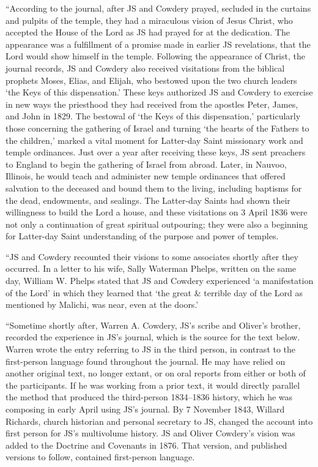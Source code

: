 			``According to the journal, after JS and Cowdery prayed, secluded in the curtains and pulpits of the temple, they had a miraculous vision of Jesus Christ, who accepted the House of the Lord as JS had prayed for at the dedication. The appearance was a fulfillment of a promise made in earlier JS revelations, that the Lord would show himself in the temple. Following the appearance of Christ, the journal records, JS and Cowdery also received visitations from the biblical prophets Moses, Elias, and Elijah, who bestowed upon the two church leaders `the Keys of this dispensation.' These keys authorized JS and Cowdery to exercise in new ways the priesthood they had received from the apostles Peter, James, and John in 1829. The bestowal of `the Keys of this dispensation,' particularly those concerning the gathering of Israel and turning `the hearts of the Fathers to the children,' marked a vital moment for Latter-day Saint missionary work and temple ordinances. Just over a year after receiving these keys, JS sent preachers to England to begin the gathering of Israel from abroad. Later, in Nauvoo, Illinois, he would teach and administer new temple ordinances that offered salvation to the deceased and bound them to the living, including baptisms for the dead, endowments, and sealings. The Latter-day Saints had shown their willingness to build the Lord a house, and these visitations on 3 April 1836 were not only a continuation of great spiritual outpouring; they were also a beginning for Latter-day Saint understanding of the purpose and power of temples.
			
			``JS and Cowdery recounted their visions to some associates shortly after they occurred. In a letter to his wife, Sally Waterman Phelps, written on the same day, William W. Phelps stated that JS and Cowdery experienced `a manifestation of the Lord' in which they learned that `the great \& terrible day of the Lord as mentioned by Malichi, was near, even at the doors.'
			
			``Sometime shortly after, Warren A. Cowdery, JS's scribe and Oliver's brother, recorded the experience in JS's journal, which is the source for the text below. Warren wrote the entry referring to JS in the third person, in contrast to the first-person language found throughout the journal. He may have relied on another original text, no longer extant, or on oral reports from either or both of the participants. If he was working from a prior text, it would directly parallel the method that produced the third-person 1834--1836 history, which he was composing in early April using JS's journal. By 7 November 1843, Willard Richards, church historian and personal secretary to JS, changed the account into first person for JS's multivolume history. JS and Oliver Cowdery's vision was added to the Doctrine and Covenants in 1876. That version, and published versions to follow, contained first-person language.
			
